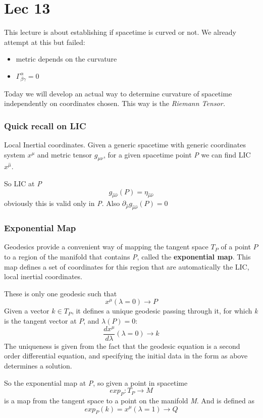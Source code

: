 \section{Lec 13}
This lecture is about establishing if spacetime is curved or not. We already attempt at this but failed:
\begin{itemize}
\item metric depends on the curvature
\item $\Gamma ^{\alpha }_{\beta \gamma } = 0$
\end{itemize}
Today we will develop an actual way to determine curvature of spacetime independently on coordinates chosen. This way is the \emph{Riemann Tensor.}\par

\subsubsection{Quick recall on LIC}
Local Inertial coordinates. Given a generic spacetime with generic coordinates system $x^{\mu }$ and metric tensor $g_{\mu \nu }$, for a given spacetime point \emph{P} we can find LIC $x^{\hat{\mu }}$. \par
So LIC at \emph{P} 
\begin{equation}
g_{\hat{\mu }\hat{\nu }} \left( P \right) = \eta _{\hat{\mu }\hat{\nu }}	
\end{equation}
obviously this is valid only in \emph{P}. Also $\partial_{\hat{\rho }} g_{\hat{\mu }\hat{\nu }} \left( P \right) = 0$

\subsubsection{Exponential Map}

Geodesics provide a convenient way of mapping the tangent space $T_{P}$ of a point $P$ to a region of the manifold that contains \emph{P}, called the \textbf{exponential map}. This map defines a set of coordinates for this region that are automatically the LIC, local inertial coordinates. \par
These is only one geodesic such that 
\[
x^{\mu }\left( \lambda = 0 \right) \to P
\]
Given a vector $k \in T_{P}$, it defines a unique geodesic passing through it, for which \emph{k} is the tangent vector at $P$, and $\lambda \left( P \right) = 0$:
\[
\frac{d x^{\mu }}{d \lambda } \left( \lambda =0 \right) \to k
\]
The uniqueness is given from the fact that the geodesic equation is a second order differential equation, and specifying the initial data in the form as above determines a solution.\par
So the exponential map at \emph{P}, so given a point in spacetime  
\begin{equation}
exp_{P} : T_{P} \to M
\end{equation}
is a map from the tangent space to a point on the manifold \emph{M}. And is defined as
\begin{equation}
exp_{P}\left( k \right) = x^{\mu }\left( \lambda =1 \right) \to Q
\end{equation}

